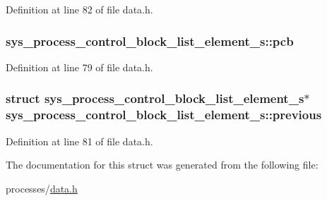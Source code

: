 Definition at line 82 of file data.\+h.

\hypertarget{structsys__process__control__block__list__element__s_a31a8928210b29e097924862367ae70a7}{}
\subsubsection[{pcb}]{ sys\+\_\+process\+\_\+control\+\_\+block\+\_\+list\+\_\+element\+\_\+s\+::pcb}\label{structsys__process__control__block__list__element__s_a31a8928210b29e097924862367ae70a7}


Definition at line 79 of file data.\+h.

\hypertarget{structsys__process__control__block__list__element__s_a91a80f7180ef47545efc44c1f94d5fb7}{}
\subsubsection[{previous}]{\setlength{\rightskip}{0pt plus 5cm}struct {\bf sys\+\_\+process\+\_\+control\+\_\+block\+\_\+list\+\_\+element\+\_\+s}$\ast$ sys\+\_\+process\+\_\+control\+\_\+block\+\_\+list\+\_\+element\+\_\+s\+::previous}\label{structsys__process__control__block__list__element__s_a91a80f7180ef47545efc44c1f94d5fb7}


Definition at line 81 of file data.\+h.



The documentation for this struct was generated from the following file\+:\begin{DoxyCompactItemize}
\item 
processes/\hyperlink{data_8h}{data.\+h}\end{DoxyCompactItemize}
